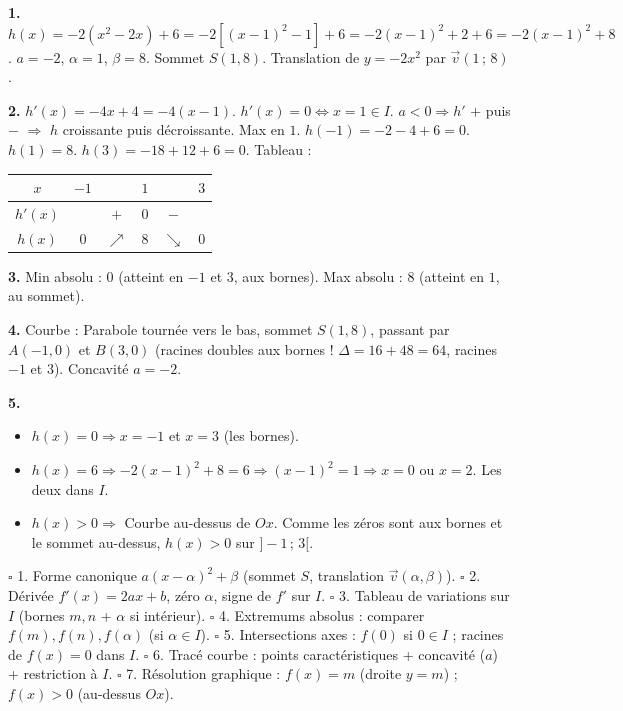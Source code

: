 \documentclass[11pt]{article}
\begin{document}
\begin{corrige}
\textbf{1.} $h(x) = -2(x^2-2x) + 6 = -2[(x-1)^2-1] + 6 = -2(x-1)^2 + 2 + 6 = -2(x-1)^2 + 8$.
$a=-2$, $\alpha=1$, $\beta=8$. Sommet $S(1,8)$. Translation de $y=-2x^2$ par $\vec{v}(1\,;\,8)$.

\textbf{2.} $h'(x) = -4x+4 = -4(x-1)$. $h'(x)=0 \Leftrightarrow x=1 \in I$.
$a<0 \Rightarrow h'$ $+$ puis $-$ $\Rightarrow$ $h$ croissante puis décroissante. Max en $1$.
$h(-1) = -2-4+6=0$. $h(1)=8$. $h(3) = -18+12+6=0$.
Tableau :
\begin{center}
\begin{tabular}{|c|ccccc|}\hline
$x$ & $-1$ & & $1$ & & $3$ \\ \hline
$h'(x)$ & & $+$ & $0$ & $-$ & \\ \hline
$h(x)$ & $0$ & $\nearrow$ & $8$ & $\searrow$ & $0$ \\ \hline
\end{tabular}
\end{center}

\textbf{3.} Min absolu : $0$ (atteint en $-1$ et $3$, aux bornes). Max absolu : $8$ (atteint en $1$, au sommet).

\textbf{4.} Courbe : Parabole tournée vers le bas, sommet $S(1,8)$, passant par $A(-1,0)$ et $B(3,0)$ (racines doubles aux bornes ! $\Delta=16+48=64$, racines $-1$ et $3$). Concavité $a=-2$.

\textbf{5.} 
\begin{itemize}
    \item $h(x)=0 \Rightarrow x=-1$ et $x=3$ (les bornes).
    \item $h(x)=6 \Rightarrow -2(x-1)^2+8=6 \Rightarrow (x-1)^2=1 \Rightarrow x=0$ ou $x=2$. Les deux dans $I$.
    \item $h(x)>0 \Rightarrow$ Courbe au-dessus de $Ox$. Comme les zéros sont aux bornes et le sommet au-dessus, $h(x)>0$ sur $]-1\,;\,3[$.
\end{itemize}
\end{corrige}

\begin{aretenir}[{Check-list pour l'étude complète sur $I=[m\,;\,n]$ (Polynôme degré 2)}]
$\square$ 1. Forme canonique $a(x-\alpha)^2+\beta$ (sommet $S$, translation $\vec{v}(\alpha,\beta)$).
$\square$ 2. Dérivée $f'(x)=2ax+b$, zéro $\alpha$, signe de $f'$ sur $I$.
$\square$ 3. Tableau de variations sur $I$ (bornes $m,n$ + $\alpha$ si intérieur).
$\square$ 4. Extremums absolus : comparer $f(m), f(n), f(\alpha)$ (si $\alpha\in I$).
$\square$ 5. Intersections axes : $f(0)$ si $0\in I$ ; racines de $f(x)=0$ dans $I$.
$\square$ 6. Tracé courbe : points caractéristiques + concavité ($a$) + restriction à $I$.
$\square$ 7. Résolution graphique : $f(x)=m$ (droite $y=m$) ; $f(x)>0$ (au-dessus $Ox$).
\end{aretenir}
\end{document}
